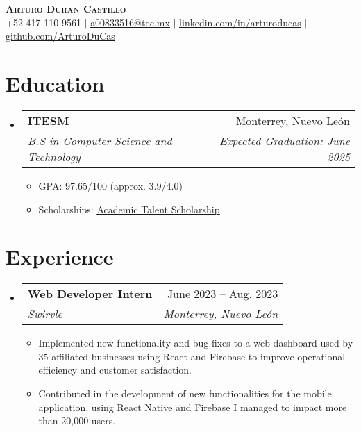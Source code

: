 \documentclass[letterpaper,11pt]{article}
\makeatletter
\newcommand{\resumeItem}[1]{
    \item\small{
            {#1 \vspace{-2pt}}
    }
}
\newcommand{\resumeSubheading}[4]{
    \vspace{-2pt}\item
    \begin{tabular*}{0.97\textwidth}[t]{l@{\extracolsep{\fill}}r}
        \textbf{#1} & #2 \\
        \textit{\small#3} & \textit{\small #4} \\
    \end{tabular*}\vspace{-7pt}
}
\newcommand{\resumeSubHeadingListStart}{\begin{itemize}[leftmargin=0.15in, label={}]}
\newcommand{\resumeSubHeadingListEnd}{\end{itemize}}
\newcommand{\resumeItemListStart}{\begin{itemize}}
\newcommand{\resumeItemListEnd}{\end{itemize}\vspace{-5pt}}
\makeatother
\begin{document}

\begin{center}
\textbf{\Huge \scshape Arturo Duran Castillo} \\ \vspace{1pt}
\small +52 417-110-9561 $|$ \href{mailto:a00833516@tec.mx}{\underline{a00833516@tec.mx}} $|$
\href{https://www.linkedin.com/in/arturoducas/}{\underline{linkedin.com/in/arturoducas}} $|$
\href{https://github.com/ArturoDuCas}{\underline{github.com/ArturoDuCas}}
\end{center}


\section{Education}
\resumeSubHeadingListStart
\resumeSubheading
{ITESM}{Monterrey, Nuevo León}
{B.S in Computer Science and Technology}{Expected Graduation: June 2025}
\resumeItemListStart
\resumeItem{GPA: 97.65/100 (approx. 3.9/4.0)}
\resumeItem{Scholarships: \href{https://drive.google.com/file/d/1b5jrPn-a_eLqLJsYaLeC222-oznbXLQm/view?usp=sharing}{\underline{Academic Talent Scholarship}}}
\resumeItemListEnd
\resumeSubHeadingListEnd



\section{Experience}
\resumeSubHeadingListStart
\resumeSubheading
{Web Developer Intern}{June 2023 -- Aug. 2023}
{Swirvle}{Monterrey, Nuevo León}
\resumeItemListStart
\resumeItem{Implemented new functionality and bug fixes to a web dashboard used by 35 affiliated businesses using React and Firebase to improve operational efficiency and customer satisfaction.}
\resumeItem{Contributed in the development of new functionalities for the mobile application, using React Native and Firebase I managed to impact more than 20,000 users.}
\resumeItemListEnd

\resumeSubHeadingListEnd
\end{document}
